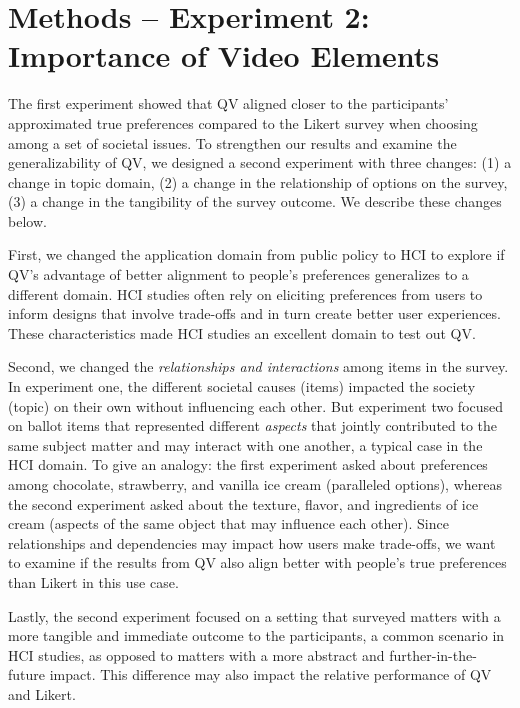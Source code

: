 \section{Methods -- Experiment 2: Importance of Video Elements}
\label{method-2}
The first experiment showed that QV aligned closer to the participants' approximated true preferences compared to the Likert survey when choosing among a set of societal issues. To strengthen our results and examine the generalizability of QV, we designed a second experiment with three changes: (1) a change in topic domain, (2) a change in the relationship of options on the survey, (3) a change in the tangibility of the survey outcome. We describe these changes below.

First, we changed the application domain from public policy to HCI to explore if QV's advantage of better alignment to people's preferences generalizes to a different domain. HCI studies often rely on eliciting preferences from users to inform designs that involve trade-offs and in turn create better user experiences. These characteristics made HCI studies an excellent domain to test out QV.

Second, we changed the \textit{relationships and interactions} among items in the survey. In experiment one, the different societal causes (items) impacted the society (topic) on their own without influencing each other. But experiment two focused on ballot items that represented different \textit{aspects} that jointly contributed to the same subject matter and may interact with one another, a typical case in the HCI domain. To give an analogy: the first experiment asked about preferences among chocolate, strawberry, and vanilla ice cream (paralleled options), whereas the second experiment asked about the texture, flavor, and ingredients of ice cream (aspects of the same object that may influence each other). Since relationships and dependencies may impact how users make trade-offs, we want to examine if the results from QV also align better with people's true preferences than Likert in this use case.

Lastly, the second experiment focused on a setting that surveyed matters with a more tangible and immediate outcome to the participants, a common scenario in HCI studies, as opposed to matters with a more abstract and further-in-the-future impact. This difference may also impact the relative performance of QV and Likert. 

